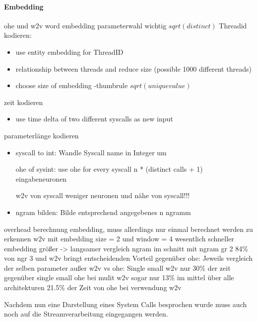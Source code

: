         \paragraph{Embedding}
            ohe und w2v
            word embedding parameterwahl wichtig $sqrt(distinct)$
            Threadid kodieren: 
            \begin{itemize}
                \item use entity embedding for ThreadID~\cite{GUO2016} 
                \item relationship between threads and reduce size (possible 1000 different threads)
                \item choose size of embedding -thumbrule $sqrt(unique value)$
            \end{itemize}
            zeit kodieren
            \begin{itemize}
                \item use time delta of two different syscalls as new input
            \end{itemize}
            parameterlänge kodieren
            \begin{itemize}
                \item syscall to int: Wandle Syscall name in Integer um

                 ohe of sysint: use ohe for every syscall 
                 n * (distinct calls + 1) eingabeneuronen 

                 w2v von syscall
                 weniger neuronen und nähe von syscall!!!
                \item ngram bilden: Bilde entsprechend angegebenes n ngramm
            \end{itemize}
            overhead berechnung embedding, muss allerdings nur einmal berechnet werden
            zu erkennen w2v mit embedding size = 2  und window = 4 wesentlich schneller
            embedding größer -> langsamer
            vergleich ngram
            im schnitt mit ngram gr 2 84\% von ngr 3 und 
            w2v bringt entscheidenden Vorteil gegenüber ohe:
            Jeweils vergleich der selben parameter außer w2v vs ohe:
            Single small w2v nur 30\% der zeit gegenüber single small ohe
            bei mulit w2v sogar nur 13\%
            im mittel über alle architekturen 21.5\% der Zeit von ohe bei verwendung w2v

        Nachdem nun eine Darstellung eines System Calls besprochen wurde muss auch noch auf die Streamverarbeitung eingegangen werden.

